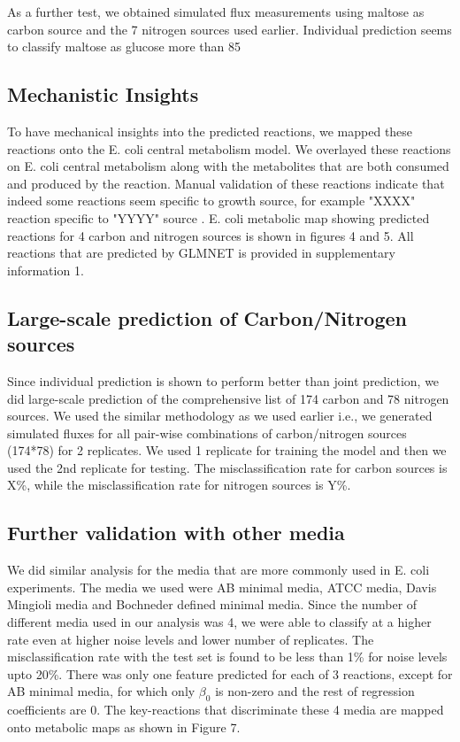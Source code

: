 \documentclass[12pt]{article}
\begin{document}
\bigskip
\noindent
As a further test, we obtained simulated flux measurements using maltose as carbon source and the 7 nitrogen sources used earlier. Individual prediction seems to classify maltose as glucose more than 85%

\subsection*{Mechanistic Insights}

\bigskip
\noindent
To have mechanical insights into the predicted reactions, we mapped these reactions onto the E. coli central metabolism model. We overlayed these reactions on E. coli central metabolism along with the metabolites that are both consumed and produced by the reaction. Manual validation of these reactions indicate that indeed some reactions seem specific to growth source, for example "XXXX" reaction specific to "YYYY" source \cite{ZZZZ}. E. coli metabolic map showing predicted reactions for 4 carbon and nitrogen sources is shown in figures 4 and 5. All reactions that are predicted by GLMNET is provided in supplementary information 1.

\bigskip
\subsection*{Large-scale prediction of Carbon/Nitrogen sources}
Since individual prediction is shown to perform better than joint prediction, we did large-scale prediction of the comprehensive list of 174 carbon and 78 nitrogen sources. We used the similar methodology as we used earlier i.e., we generated simulated fluxes for all pair-wise combinations of carbon/nitrogen sources (174*78) for 2 replicates. We used 1 replicate for training the model and then we used the 2nd replicate for testing. The misclassification rate for carbon sources is X\%, while the misclassification rate for nitrogen sources is Y\%.  

\bigskip
\subsection*{Further validation with other media}
We did similar analysis for the media that are more commonly used in E. coli experiments. The media we used were AB minimal media, ATCC media, Davis Mingioli media and Bochneder defined minimal media. Since the number of different media used in our analysis was 4, we were able to classify at a higher rate even at higher noise levels and lower number of replicates. The misclassification rate with the test set is found to be less than 1\% for noise levels upto 20\%. There was only one feature predicted for each of 3 reactions, except for AB minimal media, for which only $\beta_0$ is non-zero and the rest of regression coefficients are 0. The key-reactions that discriminate these 4 media are mapped onto metabolic maps as shown in Figure 7.
\end{document}
